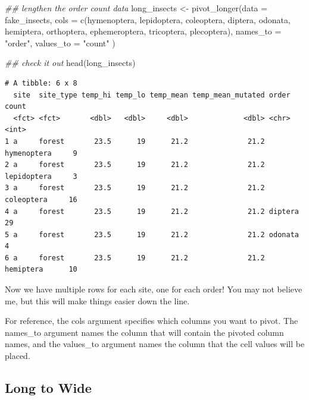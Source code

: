 \documentclass[
  letterpaper,
  DIV=11,
  numbers=noendperiod]{scrreprt}
\newenvironment{Shaded}{\begin{snugshade}}{\end{snugshade}}
\newcommand{\AttributeTok}[1]{\textcolor[rgb]{0.40,0.45,0.13}{#1}}
\newcommand{\DocumentationTok}[1]{\textcolor[rgb]{0.37,0.37,0.37}{\textit{#1}}}
\newcommand{\FunctionTok}[1]{\textcolor[rgb]{0.28,0.35,0.67}{#1}}
\newcommand{\NormalTok}[1]{\textcolor[rgb]{0.00,0.23,0.31}{#1}}
\newcommand{\OtherTok}[1]{\textcolor[rgb]{0.00,0.23,0.31}{#1}}
\newcommand{\StringTok}[1]{\textcolor[rgb]{0.13,0.47,0.30}{#1}}
\begin{document}
\begin{Shaded}
\begin{Highlighting}[]
\DocumentationTok{\#\# lengthen the order count data}
\NormalTok{long\_insects }\OtherTok{\textless{}{-}} \FunctionTok{pivot\_longer}\NormalTok{(}\AttributeTok{data =}\NormalTok{ fake\_insects, }
                             \AttributeTok{cols =} \FunctionTok{c}\NormalTok{(hymenoptera, lepidoptera, coleoptera, diptera, }
\NormalTok{                                      odonata, hemiptera, orthoptera, ephemeroptera, }
\NormalTok{                                      tricoptera, plecoptera),}
                             \AttributeTok{names\_to =} \StringTok{"order"}\NormalTok{,}
                             \AttributeTok{values\_to =} \StringTok{"count"}
\NormalTok{                             )}

\DocumentationTok{\#\# check it out}
\FunctionTok{head}\NormalTok{(long\_insects)}
\end{Highlighting}
\end{Shaded}

\begin{verbatim}
# A tibble: 6 x 8
  site  site_type temp_hi temp_lo temp_mean temp_mean_mutated order       count
  <fct> <fct>       <dbl>   <dbl>     <dbl>             <dbl> <chr>       <int>
1 a     forest       23.5      19      21.2              21.2 hymenoptera     9
2 a     forest       23.5      19      21.2              21.2 lepidoptera     3
3 a     forest       23.5      19      21.2              21.2 coleoptera     16
4 a     forest       23.5      19      21.2              21.2 diptera        29
5 a     forest       23.5      19      21.2              21.2 odonata         4
6 a     forest       23.5      19      21.2              21.2 hemiptera      10
\end{verbatim}

Now we have multiple rows for each site, one for each order! You may not
believe me, but this will make things easier down the line.

For reference, the cols argument specifies which columns you want to
pivot. The names\_to argument names the column that will contain the
pivoted column names, and the values\_to argument names the column that
the cell values will be placed.

\hypertarget{long-to-wide}{%
\subsection{Long to Wide}\label{long-to-wide}}
\end{document}
